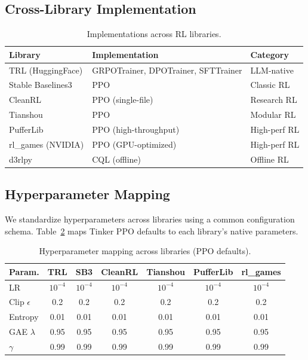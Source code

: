 \documentclass[manuscript,review,anonymous]{acmart}
\begin{document}
\subsection{Cross-Library Implementation}

\begin{table}[h]
\centering
\caption{Implementations across RL libraries.}
\label{tab:implementations}
\begin{tabular}{lll}
\toprule
\textbf{Library} & \textbf{Implementation} & \textbf{Category} \\
\midrule
TRL (HuggingFace) & GRPOTrainer, DPOTrainer, SFTTrainer & LLM-native \\
Stable Baselines3 & PPO & Classic RL \\
CleanRL & PPO (single-file) & Research RL \\
Tianshou & PPO & Modular RL \\
PufferLib & PPO (high-throughput) & High-perf RL \\
rl\_games (NVIDIA) & PPO (GPU-optimized) & High-perf RL \\
d3rlpy & CQL (offline) & Offline RL \\
\bottomrule
\end{tabular}
\end{table}

\subsection{Hyperparameter Mapping}

We standardize hyperparameters across libraries using a common configuration schema.
Table~\ref{tab:hyperparams} maps Tinker PPO defaults to each library's native parameters.

\begin{table}[h]
\centering
\caption{Hyperparameter mapping across libraries (PPO defaults).}
\label{tab:hyperparams}
\begin{tabular}{lcccccc}
\toprule
\textbf{Param.} & \textbf{TRL} & \textbf{SB3} & \textbf{CleanRL} & \textbf{Tianshou} & \textbf{PufferLib} & \textbf{rl\_games} \\
\midrule
LR & $10^{-4}$ & $10^{-4}$ & $10^{-4}$ & $10^{-4}$ & $10^{-4}$ & $10^{-4}$ \\
Clip $\epsilon$ & 0.2 & 0.2 & 0.2 & 0.2 & 0.2 & 0.2 \\
Entropy & 0.01 & 0.01 & 0.01 & 0.01 & 0.01 & 0.01 \\
GAE $\lambda$ & 0.95 & 0.95 & 0.95 & 0.95 & 0.95 & 0.95 \\
$\gamma$ & 0.99 & 0.99 & 0.99 & 0.99 & 0.99 & 0.99 \\
\bottomrule
\end{tabular}
\end{table}
\end{document}
